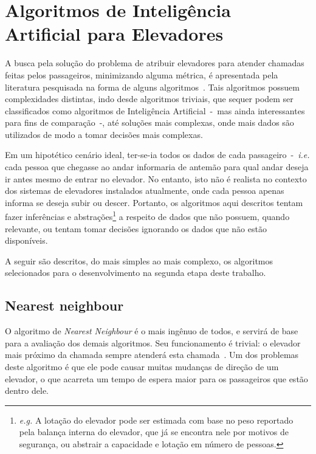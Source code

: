\chapter{\label{chap:ai}Algoritmos de Inteligência Artificial para Elevadores}


A busca pela solução do problema de atribuir elevadores para atender chamadas
feitas pelos passageiros, minimizando alguma métrica, é apresentada pela
literatura pesquisada na forma de alguns algoritmos~\cite{KOEHLEROTTIGER02}.
Tais algoritmos possuem complexidades distintas, indo desde algoritmos triviais,
que sequer podem ser classificados como algoritmos de Inteligência
Artificial~-~mas ainda interessantes para fins de comparação~-, até soluções
mais complexas, onde mais dados são utilizados de modo a tomar decisões mais
complexas.

Em um hipotético cenário ideal, ter-se-ia todos os dados de cada
passageiro~-~\textit{i.e.} cada pessoa que chegasse ao andar informaria de
antemão para qual andar deseja ir antes mesmo de entrar no elevador. No entanto,
isto não é realista no contexto dos sistemas de elevadores instalados
atualmente, onde cada pessoa apenas informa se deseja subir ou descer. Portanto,
os algoritmos aqui descritos tentam fazer inferências e
abstrações\footnote{\textit{e.g.} A lotação do elevador pode ser estimada com
base no peso reportado pela balança interna do elevador, que já se encontra nele
por motivos de segurança, ou abstrair a capacidade e lotação em número de
pessoas.} a respeito de dados que não possuem, quando relevante, ou tentam tomar
decisões ignorando os dados que não estão disponíveis.

A seguir são descritos, do mais simples ao mais complexo, os algoritmos
selecionados para o desenvolvimento na segunda etapa deste trabalho.

\section{\label{sec:ai:nn}Nearest neighbour}

O algoritmo de \textit{Nearest Neighbour} é o mais ingênuo de todos, e servirá
de base para a avaliação dos demais algoritmos. Seu funcionamento é trivial: o
elevador mais próximo da chamada sempre atenderá esta
chamada~\cite{Friese20061908}. Um dos problemas deste algoritmo é que ele pode
causar muitas mudanças de direção de um elevador, o que acarreta um tempo de
espera maior para os passageiros que estão dentro dele.

